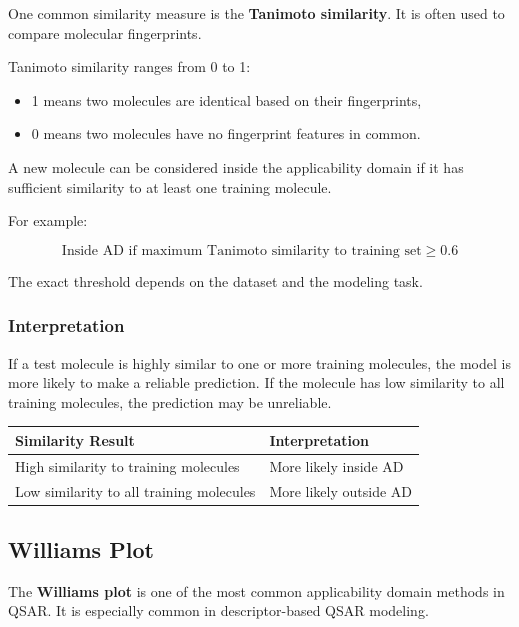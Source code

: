 \documentclass[11pt]{report}
\newenvironment{Important note}{\begin{quote}\color{red}\textbf{Important note:} }{\end{quote}}
\begin{document}
One common similarity measure is the \textbf{Tanimoto similarity}. It is often used to compare molecular fingerprints.

Tanimoto similarity ranges from 0 to 1:

\begin{itemize}[leftmargin=*]
    \item 1 means two molecules are identical based on their fingerprints,
    \item 0 means two molecules have no fingerprint features in common.
\end{itemize}

A new molecule can be considered inside the applicability domain if it has sufficient similarity to at least one training molecule.

For example:

\[
\text{Inside AD if maximum Tanimoto similarity to training set} \geq 0.6
\]

The exact threshold depends on the dataset and the modeling task.

\subsubsection*{Interpretation}

If a test molecule is highly similar to one or more training molecules, the model is more likely to make a reliable prediction. If the molecule has low similarity to all training molecules, the prediction may be unreliable.

\begin{center}
\begin{tabular}{ll}
\toprule
\textbf{Similarity Result} & \textbf{Interpretation} \\
\midrule
High similarity to training molecules & More likely inside AD \\
Low similarity to all training molecules & More likely outside AD \\
\bottomrule
\end{tabular}
\end{center}

\subsection{Williams Plot}

The \textbf{Williams plot} is one of the most common applicability domain methods in QSAR. It is especially common in descriptor-based QSAR modeling.
\end{document}
